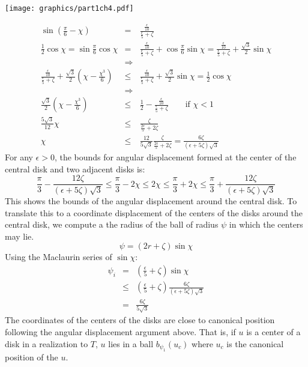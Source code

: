 \documentclass[10pt]{CSUNthesis}
\theoremstyle{plain}%
\theoremstyle{definition}
\theoremstyle{remark}
\newcommand{\lr}[1]{\left( #1 \right)}
\begin{document}
\begin{minipage}{\linewidth}
\begin{center}
\texttt{[image: graphics/part1ch4.pdf]}
\label{fig:part1ch4.pdf}
\end{center}
\end{minipage}

\begin{eqnarray*}
\sin \lr{\frac{\pi}{6} - \chi} &=& \frac{\frac{\epsilon}{10}}{\frac{\epsilon}{5}+\zeta}\\
\frac{1}{2}\cos \chi = \sin \frac{\pi}{6} \cos \chi &=& \frac{\frac{\epsilon}{10}}{\frac{\epsilon}{5}+\zeta} + \cos \frac{\pi}{6} \sin \chi = \frac{\frac{\epsilon}{10}}{\frac{\epsilon}{5}+\zeta} +\frac{\sqrt{3}}{2} \sin \chi \\
&\Rightarrow&\\
\frac{\frac{\epsilon}{10}}{\frac{\epsilon}{5}+\zeta}+ \frac{\sqrt{3}}{2} \lr{ \chi - \frac{\chi^3}{6}} &\leq& \frac{\frac{\epsilon}{10}}{\frac{\epsilon}{5}+\zeta} + \frac{\sqrt{3}}{2} \sin \chi =\frac{1}{2} \cos \chi\\
&\Rightarrow&\\
\frac{\sqrt{3}}{2} \lr{ \chi - \frac{\chi^3}{6}}&\leq& \frac{1}{2}-\frac{\frac{\epsilon}{10}}{\frac{\epsilon}{5}+\zeta}  \qquad \text{if }\chi < 1 \\
\frac{5\sqrt{3}}{12} \chi &\leq& \frac{  \zeta }{ \frac{2\epsilon}{5} + 2\zeta } \\
\chi&\leq& \frac{12}{5\sqrt{3}}\frac{  \zeta }{ \frac{2\epsilon}{5} + 2\zeta } = \frac{6 \zeta}{\lr{\epsilon + 5 \zeta}\sqrt{3}}
\end{eqnarray*}
For any $\epsilon > 0$, the bounds for angular displacement formed at the center of the central disk and two adjacent disks is:
$$ \frac{\pi}{3} - \frac{12 \zeta}{\lr{\epsilon + 5 \zeta}\sqrt{3}}\leq \frac{\pi}{3} - 2 \chi  \leq 2\chi \leq \frac{\pi}{3} + 2 \chi \leq \frac{\pi}{3} + \frac{12 \zeta}{\lr{\epsilon + 5 \zeta}\sqrt{3}}$$
This shows the bounds of the angular displacement around the central disk.  
To translate this to a coordinate displacement of the centers of the disks around the central disk, we compute a the radius of the ball of radius $\psi$ in which the centers may lie. 
$$\psi = \lr{2 r + \zeta} \sin \chi$$
Using the Maclaurin series of $\sin \chi$:
$$
\begin{array}{rcl}
\psi_i &=& \lr{ \frac{\epsilon}{5} + \zeta} \sin \chi\\
&\leq& \lr{ \frac{\epsilon}{5} + \zeta} \frac{6 \zeta}{\lr{\epsilon + 5 \zeta}\sqrt{3}}\\
&=& \frac{6\zeta}{5 \sqrt{3}}
\end{array}
$$
The coordinates of the centers of the disks are close to canonical position following the angular displacement argument above.  
That is, if $u$ is a center of a disk in a realization to $T$, $u$ lies in a ball $b_{\psi_1}\lr{u_c}$ where $u_c$ is the canonical position of the $u$.  
\end{document}
